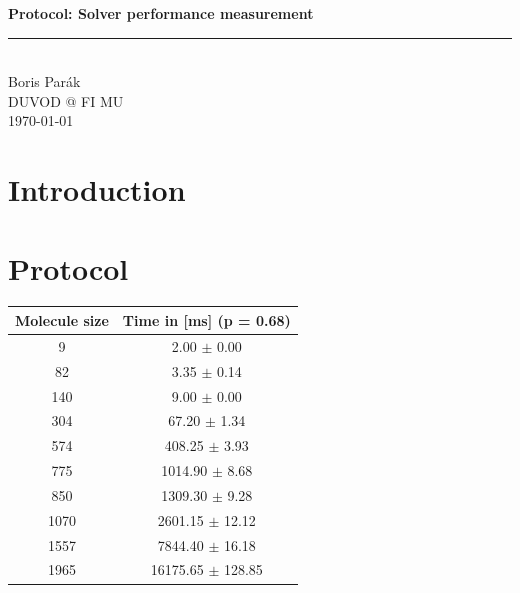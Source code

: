 \documentclass[a4paper,12pt]{article}
\makeatletter
\newcommand{\protocol}{Solver performance measurement}
\newcommand{\labtitle}{DUVOD @ FI MU}
\newcommand{\authorname}{Boris Parák}
\makeatother
\begin{document}
\begin{titlepage}
\begin{center}
{\LARGE \textbf{Protocol: \protocol} \\ \vspace{4pt}}
\rule[13pt]{\textwidth}{1pt} \\ \vspace{150pt}
{\large \authorname \\ \vspace{10pt}
{\large \textsc{\labtitle} \\ \vspace{10pt}}
\today}
\end{center}
\end{titlepage}

\newpage
\thispagestyle{empty}
\tableofcontents
\clearpage

\setcounter{page}{1}

\section{Introduction}

\pagebreak

\section{Protocol}

\begin{center}
  \begin{tabular}{ | c | c | }
    \hline
    \textbf{Molecule size} & \textbf{Time in [ms] (p = 0.68)} \\ \hline
    \hline
        9 & 2.00 $\pm$ 0.00 \\ \hline
        82 & 3.35 $\pm$ 0.14 \\ \hline
        140 & 9.00 $\pm$ 0.00 \\ \hline
        304 & 67.20 $\pm$ 1.34 \\ \hline
        574 & 408.25 $\pm$ 3.93 \\ \hline
        775 & 1014.90 $\pm$ 8.68 \\ \hline
        850 & 1309.30 $\pm$ 9.28 \\ \hline
        1070 & 2601.15 $\pm$ 12.12 \\ \hline
        1557 & 7844.40 $\pm$ 16.18 \\ \hline
        1965 & 16175.65 $\pm$ 128.85 \\ \hline
  \end{tabular}
\end{center}
\end{document}

